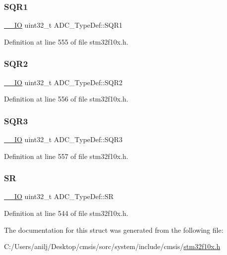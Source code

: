 \subsubsection{\texorpdfstring{S\+Q\+R1}{SQR1}}
{\footnotesize\ttfamily \hyperlink{core__sc300_8h_aec43007d9998a0a0e01faede4133d6be}{\+\_\+\+\_\+\+IO} uint32\+\_\+t A\+D\+C\+\_\+\+Type\+Def\+::\+S\+Q\+R1}



Definition at line 555 of file stm32f10x.\+h.

\mbox{\label{struct_a_d_c___type_def_a6b6e55e6c667042e5a46a76518b73d5a}} 
\subsubsection{\texorpdfstring{S\+Q\+R2}{SQR2}}
{\footnotesize\ttfamily \hyperlink{core__sc300_8h_aec43007d9998a0a0e01faede4133d6be}{\+\_\+\+\_\+\+IO} uint32\+\_\+t A\+D\+C\+\_\+\+Type\+Def\+::\+S\+Q\+R2}



Definition at line 556 of file stm32f10x.\+h.

\mbox{\label{struct_a_d_c___type_def_a51dbdba74c4d3559157392109af68fc6}} 
\subsubsection{\texorpdfstring{S\+Q\+R3}{SQR3}}
{\footnotesize\ttfamily \hyperlink{core__sc300_8h_aec43007d9998a0a0e01faede4133d6be}{\+\_\+\+\_\+\+IO} uint32\+\_\+t A\+D\+C\+\_\+\+Type\+Def\+::\+S\+Q\+R3}



Definition at line 557 of file stm32f10x.\+h.

\mbox{\label{struct_a_d_c___type_def_a9745df96e98f3cdc2d05ccefce681f64}} 
\subsubsection{\texorpdfstring{SR}{SR}}
{\footnotesize\ttfamily \hyperlink{core__sc300_8h_aec43007d9998a0a0e01faede4133d6be}{\+\_\+\+\_\+\+IO} uint32\+\_\+t A\+D\+C\+\_\+\+Type\+Def\+::\+SR}



Definition at line 544 of file stm32f10x.\+h.



The documentation for this struct was generated from the following file\+:\begin{DoxyCompactItemize}
\item 
C\+:/\+Users/anilj/\+Desktop/cmsis/sorc/system/include/cmsis/\hyperlink{stm32f10x_8h}{stm32f10x.\+h}\end{DoxyCompactItemize}
